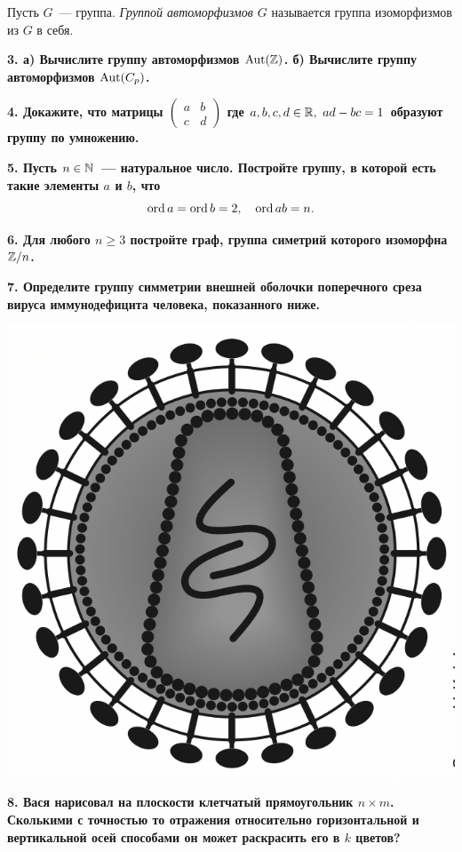 \documentclass[10pt]{article}
\begin{document}
\begin{landscape}
\begin{multicols}{2}
	\begin{definition} 
		Пусть $G$~--- группа. \emph{Группой автоморфизмов $G$} называется группа изоморфизмов из $G$ в себя. 
	\end{definition}

	\bf{3.} а) Вычислите группу автоморфизмов $\mathrm{\operatorname{Aut}}(\mathbb{Z})$. б) Вычислите группу автоморфизмов $\mathrm{\operatorname{Aut}}(C_{p})$. 

	\bf{4.} Докажите, что матрицы  $\begin{pmatrix} a & b \\ c & d \end{pmatrix}$ где $a, b, c, d \in \mathbb{R}, \ ad - bc = 1$ образуют группу по умножению. 

	\bf{5.} Пусть $n \in \mathbb{N}$~--- натуральное число. Постройте группу, в которой есть такие элементы $a$ и $b$, что 
	\[
		\operatorname{ord}{a} = \operatorname{ord}{b} =  2, \quad \operatorname{ord}{ab} = n.
	\]
	
	\bf{6.} Для любого $n \ge 3$ постройте граф, группа симетрий которого изоморфна $\mathbb{Z}/n$.

	\bf{7.} Определите группу симметрии внешней оболочки поперечного среза вируса иммунодефицита человека, показанного ниже.

	\begin{center}
		\includegraphics[scale = 0.3]{pic/pic_3.png}
	\end{center}

	\bf{8.} Вася нарисовал на  плоскости  клетчатый прямоугольник $n \times m$. Сколькими  с точностью то отражения относительно горизонтальной и вертикальной осей способами он может раскрасить его в $k$ цветов?

 

	\end{multicols}
	\end{landscape}
\end{document}
